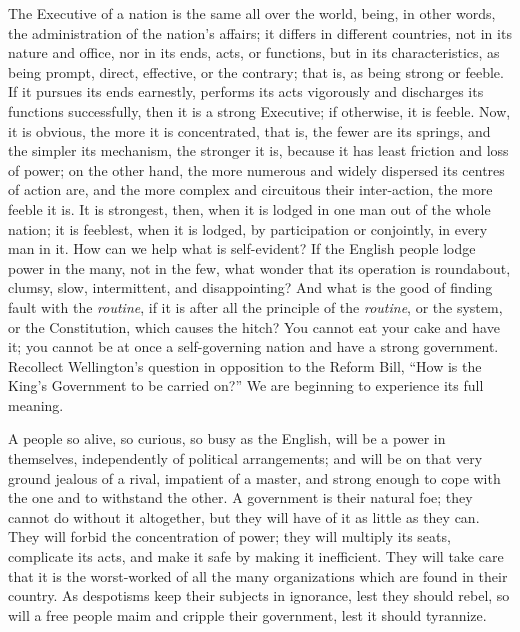 The Executive of a nation is the same all over
the world, being, in other words, the administration of the nation's
affairs; it differs in different countries, not in its nature and
office, nor in its ends, acts, or functions, but in its
characteristics, as being prompt, direct, effective, or the contrary;
that is, as being strong or feeble. If it pursues its ends earnestly,
performs its acts vigorously and discharges its functions
successfully, then it is a strong Executive; if otherwise, it is
feeble. Now, it is obvious, the more it is concentrated, that is, the
fewer are its springs, and the simpler its mechanism, the stronger it
is, because it has least friction and loss of power; on the other
hand, the more numerous and widely dispersed its centres of action
are, and the more complex and circuitous their inter-action, the more
feeble it is. It is strongest, then, when it is lodged in one man out
of the whole nation; it is feeblest, when it is lodged, by
participation or conjointly, in every man in it. How can we help what
is self-evident? If the English people lodge power in the many, not in
the few, what wonder that its operation is roundabout, clumsy, slow,
intermittent, and disappointing? And what is the good of finding fault
with the \emph{routine}, if it is after all the principle of the \emph{routine},
or the system, or the Constitution, which causes the hitch? You cannot
eat your cake and have it; you cannot be at once a self-governing
nation and have a strong government. Recollect Wellington's question
in opposition to the Reform Bill, ``How is the King's Government to
be carried on?'' We are beginning to experience its full meaning.

A people so alive, so curious, so busy as the
English, will be a power in themselves, independently of political
arrangements; and will be on that very ground jealous of a rival,
impatient of a master, and strong enough to cope with the one and to
withstand the other. A government is their natural foe; they cannot do
without it altogether, but they will have of it as little as they can.
They will forbid the concentration of power; they will multiply its
seats, complicate its acts, and make it safe by making it
inefficient. They will take care that it is the worst-worked of all
the many organizations which are found in their country. As despotisms
keep their subjects in ignorance, lest they should rebel, so will a
free people maim and cripple their government, lest it should
tyrannize.

